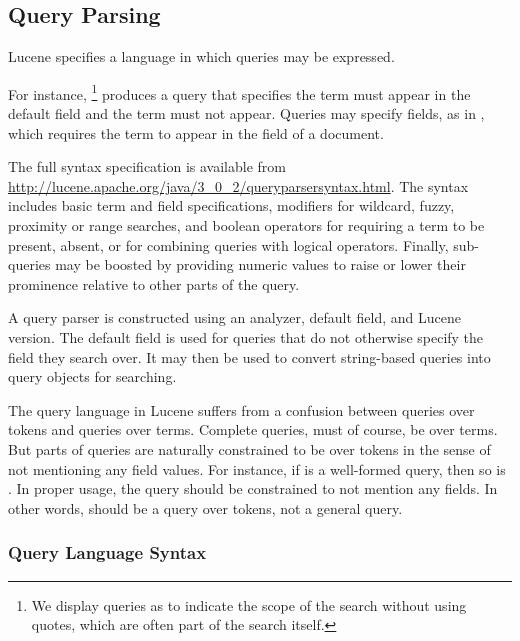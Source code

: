 \subsection{Query Parsing}

Lucene specifies a language in which queries may be expressed.  

For instance, %
%
\footnote{We display queries  as  to
indicate the scope of the search without using quotes, which are often
part of the search itself.}
%
produces a query that specifies the term  must
appear in the default field and the term  must not
appear.  Queries may specify fields, as in ,
which requires the term  to appear in the
 field of a document.

The full syntax specification is available from
\url{http://lucene.apache.org/java/3_0_2/queryparsersyntax.html}.  The
syntax includes basic term and field specifications, modifiers for
wildcard, fuzzy, proximity or range searches, and boolean operators
for requiring a term to be present, absent, or for combining queries
with logical operators.  Finally, sub-queries may be boosted by providing
numeric values to raise or lower their prominence relative to other
parts of the query.

A query parser is constructed using an analyzer, default field, and
Lucene version.  The default field is used for queries that do not
otherwise specify the field they search over.  It may then be used to
convert string-based queries into query objects for searching.

The query language in Lucene suffers from a confusion between queries
over tokens and queries over terms.  Complete queries, must of course,
be over terms.  But parts of queries are naturally constrained to be
over tokens in the sense of not mentioning any field values.  For
instance, if  is a well-formed query, then so is
.  In proper usage, the query  should
be constrained to not mention any fields.  In other words, 
should be a query over tokens, not a general query.

\subsubsection{Query Language Syntax}


